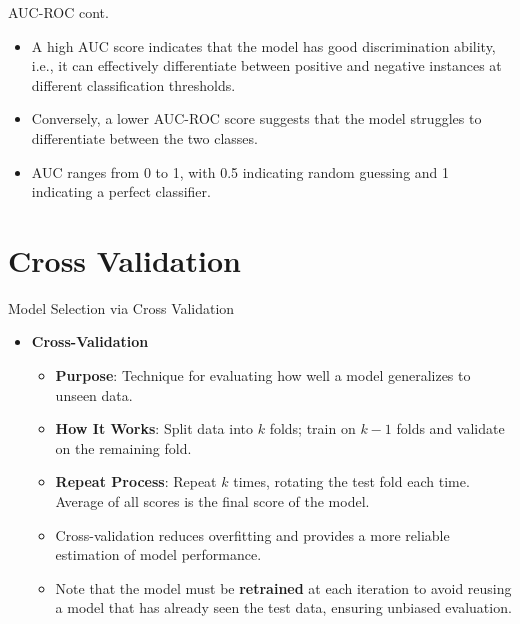 \documentclass[serif, aspectratio=169]{beamer}
\begin{document}
\begin{frame}{AUC-ROC cont.}
    \begin{itemize}
        \item A high AUC score indicates that the model has good discrimination ability, i.e., it can effectively differentiate between positive and negative instances at different classification thresholds.
        \item Conversely, a lower AUC-ROC score suggests that the model struggles to differentiate between the two classes.
        \item AUC ranges from 0 to 1, with 0.5 indicating random guessing and 1 indicating a perfect classifier.


    \end{itemize}
\end{frame}

\section{Cross Validation}

\begin{frame}{Model Selection via Cross Validation}
    \begin{itemize}
        \item \textbf{Cross-Validation}
        \medskip
        \begin{itemize}\itemsep1em
            \item \justifying \textbf{Purpose}:
            Technique for evaluating how well a model generalizes to unseen data.
            \item \justifying \textbf{How It Works}:
            Split data into $k$ folds; train on $k-1$ folds and validate on the remaining fold.
            \item \justifying \textbf{Repeat Process}:
            Repeat $k$ times, rotating the test fold each time. Average of all scores is the final score of the model.
            \item \justifying Cross-validation
            reduces overfitting and provides a more reliable estimation of model performance.
            \item Note that the model must be \textbf{retrained} at each iteration to avoid reusing a model that has already seen the test data, ensuring unbiased evaluation.
        \end{itemize}
    \end{itemize}
\end{frame}
\end{document}
